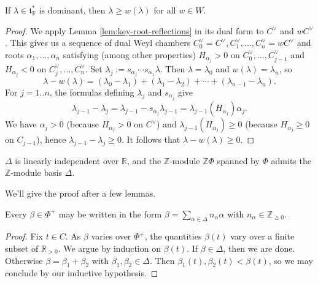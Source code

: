 \documentclass[reqno]{amsart} 
\begin{document}
\begin{corollary}
  If $\lambda \in \mathfrak{t}_{\mathbb{R}}^*$ is dominant, then $\lambda \geq w(\lambda)$ for all $w \in W$.
\end{corollary}
\begin{proof}
  We apply Lemma \ref{lem:key-root-reflections} in its dual form to $C^\vee$ and $w C^\vee$.  This gives us a sequence of dual Weyl chambers $C_0^\vee = C^\vee, C_1^\vee, \dotsc, C_n^\vee = w C^\vee$ and roots $\alpha_1,\dotsc,\alpha_n$ satisfying (among other properties) $H_{\alpha_j} > 0$ on $C_0^{\vee}, \dotsc, C_{j-1}^{\vee}$ and $H_{\alpha_j} < 0$ on $C_j^{\vee}, \dotsc, C_{n}^{\vee}$.  Set $\lambda_j := s_{\alpha_j} \dotsb s_{\alpha_1} \lambda$.  Then $\lambda = \lambda_0$ and $w(\lambda) = \lambda_n$, so
  \begin{equation*}
    \lambda - w(\lambda) = (\lambda_0 - \lambda_1) + (\lambda_1 - \lambda_2) + \dotsb + (\lambda_{n-1} - \lambda_n).
  \end{equation*}
  For $j=1..n$, the formulas defining $\lambda_j$ and $s_{\alpha_j}$ give
  \begin{equation*}
    \lambda_{j-1} - \lambda_j = \lambda_{j-1} - s_{\alpha_j} \lambda_{j-1} = \lambda_{j-1}(H_{\alpha_j}) \alpha_j.
  \end{equation*}
  We have $\alpha_j > 0$ (because $H_{\alpha_j} > 0$ on $C^\vee$) and $\lambda_{j-1}(H_{\alpha_j}) \geq 0$ (because $H_{\alpha_j} \geq0$ on $C_{j-1}$), hence $\lambda_{j-1} - \lambda_j \geq 0$.  It follows that $\lambda - w(\lambda) \geq 0$.
\end{proof}

\begin{theorem}\label{thm:simple-system-is-linearly-indep}
  $\Delta$ is linearly independent over $\mathbb{R}$, and the $\mathbb{Z}$-module $\mathbb{Z} \Phi$ spanned by $\Phi$ admits the $\mathbb{Z}$-module basis $\Delta$.
\end{theorem}
We'll give the proof after a few lemmas.

\begin{lemma}\label{lem:pos-roots-via-simple-roots}
  Every $\beta \in \Phi^+$ may be written in the form $\beta = \sum_{\alpha \in \Delta} n_\alpha \alpha$ with $n_\alpha \in \mathbb{Z}_{\geq 0}$.
\end{lemma}
\begin{proof}
  Fix $t \in C$.  As $\beta$ varies over $\Phi^+$, the quantities $\beta(t)$ vary over a finite subset of $\mathbb{R}_{>0}$.  We argue by induction on $\beta(t)$.  If $\beta \in \Delta$, then we are done.  Otherwise $\beta = \beta_1 + \beta_2$ with $\beta_1, \beta_2 \in \Delta$.  Then $\beta_1(t), \beta_2(t) < \beta(t)$, so we may conclude by our inductive hypothesis.
\end{proof}
\end{document}
